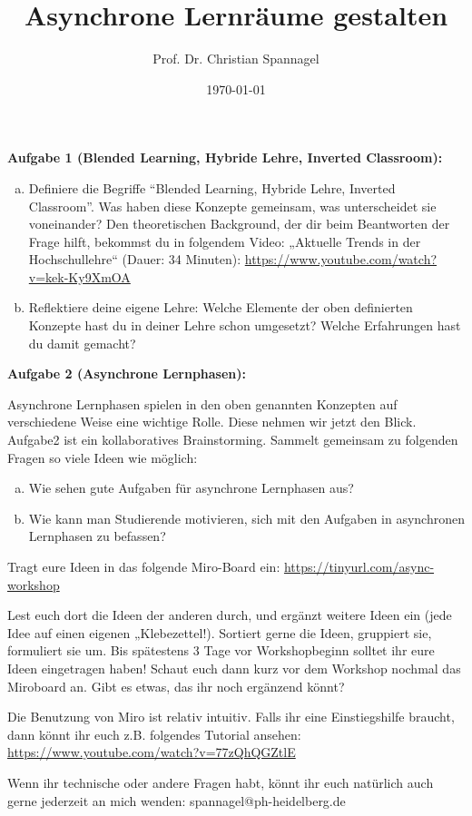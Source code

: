 \documentclass{../cssheet}
\title{Asynchrone Lernräume gestalten}
\author{Prof. Dr. Christian Spannagel}
\date{\today}
\begin{document}
\printtitle
\printsubtitle

\textbf{Aufgabe 1 (Blended Learning, Hybride Lehre, Inverted Classroom):} 

\begin{enumerate}[a)]
\item Definiere die Begriffe “Blended Learning, Hybride Lehre, Inverted Classroom”. Was haben diese Konzepte gemeinsam, was unterscheidet sie voneinander?
Den theoretischen Background, der dir beim Beantworten der Frage hilft, bekommst du in folgendem Video: „Aktuelle Trends in der Hochschullehre“ (Dauer: 34 Minuten): \url{https://www.youtube.com/watch?v=kek-Ky9XmOA}
\item Reflektiere deine eigene Lehre: Welche Elemente der oben definierten Konzepte hast du in deiner Lehre schon umgesetzt? Welche Erfahrungen hast du damit gemacht?
\end{enumerate}


\textbf{Aufgabe 2 (Asynchrone Lernphasen):} 

Asynchrone Lernphasen spielen in den oben genannten Konzepten auf verschiedene Weise eine wichtige Rolle. Diese nehmen wir jetzt den Blick. Aufgabe2 ist ein kollaboratives Brainstorming. Sammelt gemeinsam zu folgenden Fragen so viele Ideen wie möglich:

\begin{enumerate}[a)]
\item Wie sehen gute Aufgaben für asynchrone Lernphasen aus?
\item Wie kann man Studierende motivieren, sich mit den Aufgaben in asynchronen Lernphasen zu befassen?
\end{enumerate}

Tragt eure Ideen in das folgende Miro-Board ein: \url{https://tinyurl.com/async-workshop}

Lest euch dort die Ideen der anderen durch, und ergänzt weitere Ideen ein (jede Idee auf einen eigenen „Klebezettel!). Sortiert gerne die Ideen, gruppiert sie, formuliert sie um. Bis spätestens 3 Tage vor Workshopbeginn solltet ihr eure Ideen eingetragen haben! Schaut euch dann kurz vor dem Workshop nochmal das Miroboard an. Gibt es etwas, das ihr noch ergänzend könnt?

Die Benutzung von Miro ist relativ intuitiv. Falls ihr eine Einstiegshilfe braucht, dann könnt ihr euch z.B. folgendes Tutorial ansehen: \url{https://www.youtube.com/watch?v=77zQhQGZtlE}

Wenn ihr technische oder andere Fragen habt, könnt ihr euch natürlich auch gerne jederzeit an mich wenden: spannagel@ph-heidelberg.de 


\vspace*{10mm}
\printlicense

\printsocials


\end{document}
